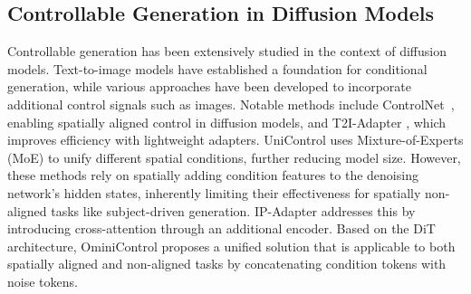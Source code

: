 \subsection{Controllable Generation in Diffusion Models}

Controllable generation has been extensively studied in the context of diffusion models. Text-to-image models \cite{ddpm, ddim} have established a foundation for conditional generation, while various approaches have been developed to incorporate additional control signals such as images. Notable methods include ControlNet~\cite{controlnet}, enabling spatially aligned control in diffusion models, and T2I-Adapter \cite{t2i}, which improves efficiency with lightweight adapters. UniControl \cite{unicontrol} uses Mixture-of-Experts (MoE) to unify different spatial conditions, further reducing model size.  However, these methods rely on spatially adding condition features to the denoising network’s hidden states, inherently limiting their effectiveness for spatially non-aligned tasks like subject-driven generation. IP-Adapter \cite{ipa} addresses this by introducing cross-attention through an additional encoder. Based on the DiT architecture, OminiControl \cite{ominicontrol} proposes a unified solution that is applicable to both spatially aligned and non-aligned tasks by concatenating condition tokens with noise tokens.










